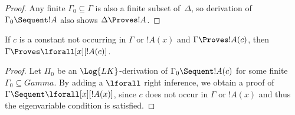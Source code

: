 \documentclass[../../include/open-logic-section]{subfiles}
\begin{document}
\begin{proof}
Any finite $\Gamma_0 \subseteq \Gamma$ is also a finite subset
of~$\Delta$, so derivation of $\Gamma_0 \Sequent !A$ also shows
$\Delta \Proves !A$.
\end{proof}

\begin{thm}
 If $c$ is a constant not occurring
in $\Gamma$ or $!A(x)$ and $\Gamma \Proves !A(c)$, then $\Gamma
\Proves \lforall[x][!A(c)]$.
\end{thm}

\begin{proof}
Let $\Pi_0$ be an $\Log{LK}$-derivation of $\Gamma_0 \Sequent !A(c)$
for some finite $\Gamma_0 \subseteq Gamma$.  By adding a $\lforall$
right inference, we obtain a proof of $\Gamma \Sequent
\lforall[x][!A(x)]$, since $c$ does not occur in $\Gamma$ or $!A(x)$
and thus the eigenvariable condition is satisfied.
\end{proof}
\end{document}
